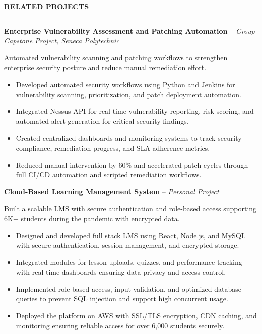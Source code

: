 \documentclass[10pt,letterpaper]{article}
\begin{document}
\vspace{6pt}

\textbf{RELATED PROJECTS}\\[-8pt]
\noindent\rule{\textwidth}{1pt}

\vspace{-2pt}

\textbf{Enterprise Vulnerability Assessment and Patching Automation} -- \emph{Group Capstone Project, Seneca Polytechnic}

\vspace{-1pt}

Automated vulnerability scanning and patching workflows to strengthen enterprise security posture and reduce manual remediation effort.
\vspace{-1pt}
\begin{itemize}
\item Developed automated security workflows using Python and Jenkins for vulnerability scanning, prioritization, and patch deployment automation.
\item Integrated Nessus API for real-time vulnerability reporting, risk scoring, and automated alert generation for critical security findings.
\item Created centralized dashboards and monitoring systems to track security compliance, remediation progress, and SLA adherence metrics.
\item Reduced manual intervention by 60\% and accelerated patch cycles through full CI/CD automation and scripted remediation workflows.
\end{itemize}

\textbf{Cloud-Based Learning Management System} -- \emph{Personal Project}

\vspace{-1pt}

Built a scalable LMS with secure authentication and role-based access supporting 6K+ students during the pandemic with encrypted data.
\vspace{-1pt}
\begin{itemize}
\item Designed and developed full stack LMS using React, Node.js, and MySQL with secure authentication, session management, and encrypted storage.
\item Integrated modules for lesson uploads, quizzes, and performance tracking with real-time dashboards ensuring data privacy and access control.
\item Implemented role-based access, input validation, and optimized database queries to prevent SQL injection and support high concurrent usage.
\item Deployed the platform on AWS with SSL/TLS encryption, CDN caching, and monitoring ensuring reliable access for over 6,000 students securely.
\end{itemize}
\end{document}
